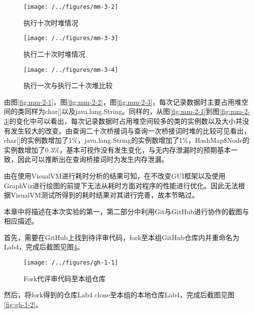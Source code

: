 \begin{figure}
\centering
\texttt{[image: /../figures/mm-3-2]}
\caption{执行十次时堆情况}
\label{fig:mm-3-2}
\end{figure}

\begin{figure}
\centering
\texttt{[image: /../figures/mm-3-3]}
\caption{执行二十次时堆情况}
\label{fig:mm-3-3}
\end{figure}

\begin{figure}
\centering
\texttt{[image: /../figures/mm-3-4]}
\caption{执行一次与执行二十次堆比较}
\label{fig:mm-3-4}
\end{figure}

由图\ref{fig:mm-2-1}，图\ref{fig:mm-2-2}，图\ref{fig:mm-2-3}，每次记录数据时主要占用堆空间的类同样为char[]以及java.lang.String。同样的，从图\ref{fig:mm-2-1}到图\ref{fig:mm-2-3}的变化中可以看出，每次记录数据时占用堆空间较多的类的实例数以及大小并没有发生较大的改变。由查询二十次桥接词与查询一次桥接词时堆的比较可见看出，char[]的实例数增加了1\%，java.lang.String的实例数增加了1\%，HashMap\$Node的实例数增加了0.3\%，基本可视作没有发生变化，与无内存泄漏时的预期基本一致，因此可以推断出在查询桥接词时为发生内存泄漏。


由在使用VisualVM进行耗时分析的结果可知，在不改变GUI框架以及使用GraphViz进行绘图的前提下无法从耗时方面对程序的性能进行优化。因此无法根据VisualVM测试所得到的耗时结果对其进行完善，故本节略过。


本章中将描述在本次实验的第一，第二部分中利用Git与GitHub进行协作的截图与相应描述。

首先，需要在GitHub上找到待评审代码，fork至本组GitHub仓库内并重命名为Lab4，完成后截图见图\ref{fig:gh-1-1}。

\begin{figure}
\centering
\texttt{[image: /../figures/gh-1-1]}
\caption{Fork代评审代码至本组仓库}
\label{fig:gh-1-1}
\end{figure}

然后，将fork得到的仓库Lab4 clone至本组的本地仓库Lab4，完成后截图见图\ref{fig:gh-1-2}。


